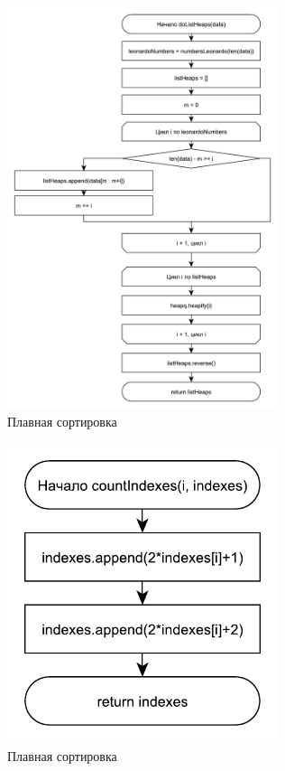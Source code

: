 \documentclass[12pt,a4paper]{scrartcl}
\begin{document}
		\begin{figure}[H]
			\centering
			\includegraphics[width=300px]{32.pdf}
			\caption{Плавная сортировка}
			\label{graph2.6}
		\end{figure}
		
		\begin{figure}[H]
			\centering
			\includegraphics[width=300px]{33.pdf}
			\caption{Плавная сортировка}
			\label{graph2.7}
		\end{figure}
		
\end{document}
